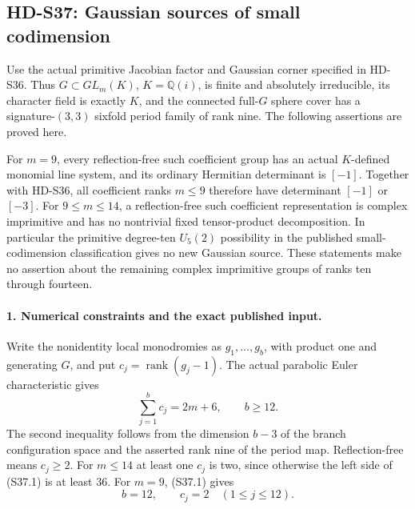 \subsection{HD-S37: Gaussian sources of small codimension}
\label{sec:small-codimension-gaussian}

Use the actual primitive Jacobian factor and Gaussian corner specified
in HD-S36. Thus \(G\subset GL_m(K)\), \(K=\mathbb Q(i)\), is
finite and absolutely irreducible, its character field is exactly
\(K\), and the connected full-\(G\) sphere cover has a
signature-\((3,3)\) sixfold period family of rank nine.
The following assertions are proved here.

For \(m=9\), every reflection-free such coefficient group has
an actual \(K\)-defined monomial line system, and its ordinary
Hermitian determinant is \([-1]\). Together with HD-S36, all
coefficient ranks \(m\le9\) therefore have determinant
\([-1]\) or \([-3]\). For \(9\le m\le14\), a
reflection-free such coefficient representation is complex
imprimitive and has no nontrivial fixed tensor-product decomposition.
In particular the primitive degree-ten \(U_5(2)\) possibility
in the published small-codimension classification gives no new
Gaussian source. These statements make no assertion about the
remaining complex imprimitive groups of ranks ten through fourteen.

\paragraph{1. Numerical constraints and the exact published input.}
Write the nonidentity local monodromies as
\(g_1,\ldots,g_b\), with product one and generating \(G\),
and put \(c_j=\operatorname{rank}(g_j-1)\).
The actual parabolic Euler characteristic gives
\[
             \sum_{j=1}^b c_j=2m+6,\qquad b\ge12.             \tag{S37.1}
\]
The second inequality follows from the dimension \(b-3\) of the
branch configuration space and the asserted rank nine of the period
map. Reflection-free means \(c_j\ge2\). For \(m\le14\)
at least one \(c_j\) is two, since otherwise the left side of
(S37.1) is at least 36. For \(m=9\), (S37.1) gives
\[
                       b=12,\qquad c_j=2\quad(1\le j\le12).
                                                               \tag{S37.2}
\]

